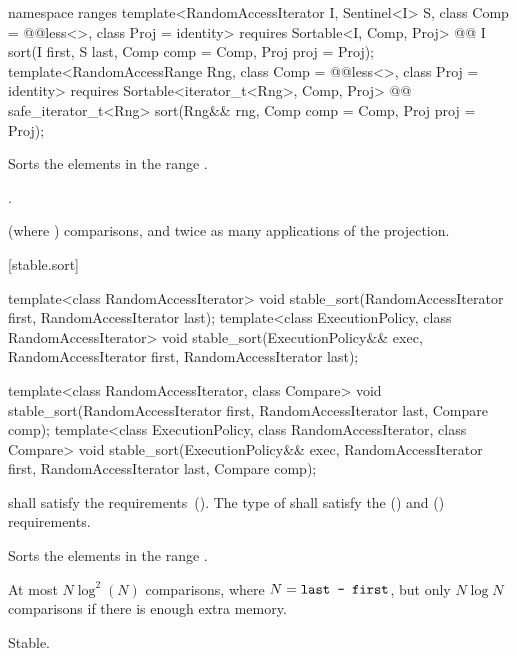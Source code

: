 \begin{addedblock}
%
\begin{itemdecl}
namespace ranges {
  template<RandomAccessIterator I, Sentinel<I> S, class Comp = @@less<>,
      class Proj = identity>
    requires Sortable<I, Comp, Proj>
    @@ I
      sort(I first, S last, Comp comp = Comp{}, Proj proj = Proj{});
  template<RandomAccessRange Rng, class Comp = @@less<>, class Proj = identity>
    requires Sortable<iterator_t<Rng>, Comp, Proj>
    @@ safe_iterator_t<Rng>
      sort(Rng&& rng, Comp comp = Comp{}, Proj proj = Proj{});
}
\end{itemdecl}

\begin{itemdescr}
\pnum
\effects
Sorts the elements in the range
.

\pnum
\returns {}.

\pnum
\complexity
{}
(where
)
comparisons, and twice as many applications of the projection.
\end{itemdescr}
\end{addedblock}

[stable.sort]{}

%
\begin{itemdecl}
template<class RandomAccessIterator>
  void stable_sort(RandomAccessIterator first, RandomAccessIterator last);
template<class ExecutionPolicy, class RandomAccessIterator>
  void stable_sort(ExecutionPolicy&& exec,
                   RandomAccessIterator first, RandomAccessIterator last);

template<class RandomAccessIterator, class Compare>
  void stable_sort(RandomAccessIterator first, RandomAccessIterator last,
                   Compare comp);
template<class ExecutionPolicy, class RandomAccessIterator, class Compare>
  void stable_sort(ExecutionPolicy&& exec,
                   RandomAccessIterator first, RandomAccessIterator last,
                   Compare comp);
\end{itemdecl}

\begin{itemdescr}
\pnum
\requires
{} shall satisfy the
 requirements~(). The type
of  shall satisfy the
 () and
 () requirements.

\pnum
\effects
Sorts the elements in the range .

\pnum
\complexity
At most $N \log^2(N)$
comparisons, where
$N = \texttt{last - first}$, but only $N \log N$ comparisons if there is enough extra memory.

\pnum
\remarks Stable.
\end{itemdescr}

